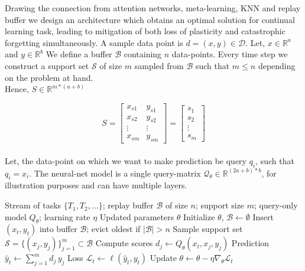 \documentclass{article}
\begin{document}
Drawing the connection from  attention networks, meta-learning, KNN and replay buffer we design an architecture which obtains an optimal solution for continual learning task, leading to mitigation 
of both loss of plasticity and catastrophic forgetting simultaneously.
A sample data point is $d = (x, y) \in \mathcal{D}$.
Let, $x \in \mathbb{R}^a$ and  $y \in \mathbb{R}^b$
We define a buffer $\mathcal{B}$ containing $n$ data-points.
Every time step we construct a support set $\mathcal{S}$ of size $m$ sampled from $\mathcal{B}$ such that $m \le n$ depending on the problem at hand.
\\Hence,  $S \in \mathbb{R}^{m* (a+b)}$ 

\[
S =
\begin{bmatrix}
x_{s1} & y_{s1} \\
x_{s2} & y_{s2} \\
\vdots & \vdots \\
x_{sm} & y_{sm}
\end{bmatrix}
=
\begin{bmatrix}
s_1 \\
s_2 \\
\vdots \\
s_m
\end{bmatrix}
\]
\\Let, the data-point on which we want to make prediction be query $q_i$, such that $q_i=x_i$.
The neural-net model is a single query-matrix $\mathcal{Q_\theta} \in \mathbb{R}^{(2a + b)*b}$, for illustration purposes and can have multiple layers.


\begin{algorithm}[ht]
\caption{Query-Only Attention with Replay Buffer}
\label{alg:query_only}
\begin{algorithmic}[1]
\Require Stream of tasks $\{T_1, T_2, \ldots\}$; replay buffer $\mathcal{B}$ of size $n$; support size $m$; query-only model $Q_\theta$; learning rate $\eta$
\Ensure Updated parameters $\theta$
\State Initialize $\theta$, $\mathcal{B} \gets \emptyset$
    \State Insert $(x_t,y_t)$ into buffer $\mathcal{B}$; evict oldest if $|\mathcal{B}| > n$
    \State Sample support set $\mathcal{S} = \{(x_j,y_j)\}_{j=1}^m \subset \mathcal{B}$
    \State Compute scores $d_j \gets Q_\theta(x_t, x_j, y_j)$
    \State Prediction $\hat{y}_t \gets \sum_{j=1}^m d_j \, y_j$
    \State Loss $\mathcal{L}_t \gets \ell(\hat{y}_t, y_t)$
    \State Update $\theta \gets \theta - \eta \nabla_\theta \mathcal{L}_t$
\EndFor
\end{algorithmic}
\end{algorithm}
\end{document}
